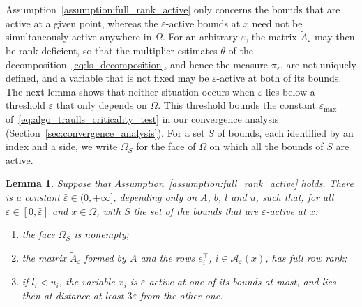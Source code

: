 \documentclass[pdflatex,sn-mathphys-num]{sn-jnl}%
\theoremstyle{thmstyleone}%
\newtheorem{lemma}[theorem]{Lemma}
\newcommand{\calA}{{\mathcal{A}}}
\begin{document}
Assumption~\ref{assumption:full_rank_active} only concerns the bounds that are active at a given point, whereas the $\varepsilon$-active bounds at $x$ need not be simultaneously active anywhere in $\Omega$. For an arbitrary $\varepsilon$, the matrix $\tilde{A}_\varepsilon$ may then be rank deficient, so that the multiplier estimates $\theta$ of the decomposition~\eqref{eq:ls_decomposition}, and hence the measure $\pi_\varepsilon$, are not uniquely defined, and a variable that is not fixed may be $\varepsilon$-active at both of its bounds. The next lemma shows that neither situation occurs when $\varepsilon$ lies below a threshold $\bar\varepsilon$ that only depends on $\Omega$. This threshold bounds the constant $\varepsilon_{\max}$ of~\eqref{eq:algo_traulls_criticality_test} in our convergence analysis (Section~\ref{sec:convergence_analysis}). For a set $S$ of bounds, each identified by an index and a side, we write $\Omega_S$ for the face of $\Omega$ on which all the bounds of $S$ are active.
\begin{lemma}\label{lemma:eps_threshold}
	Suppose that Assumption~\ref{assumption:full_rank_active} holds. There is a constant $\bar\varepsilon \in (0,+\infty]$, depending only on $A$, $b$, $l$ and $u$, such that, for all $\varepsilon \in [0,\bar\varepsilon]$ and $x \in \Omega$, with $S$ the set of the bounds that are $\varepsilon$-active at $x$:
	\begin{enumerate}[label=(\roman*), leftmargin=*, itemsep=2pt]
		\item the face $\Omega_S$ is nonempty;
		\item the matrix $\tilde{A}_\varepsilon$ formed by $A$ and the rows $e_i^\top$, $i \in \calA_\varepsilon(x)$, has full row rank;
		\item if $l_i < u_i$, the variable $x_i$ is $\varepsilon$-active at one of its bounds at most, and lies then at distance at least $3\varepsilon$ from the other one.
	\end{enumerate}
\end{lemma}
\end{document}
